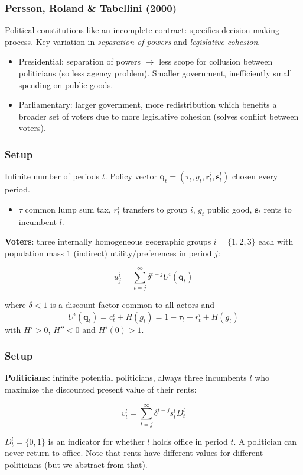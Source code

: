 \documentclass[11pt,aspectratio=169]{beamer}
\begin{document}
\begin{frame}\frametitle{Persson, Roland \& Tabellini (2000)}

Political constitutions like an incomplete contract: specifies decision-making process. Key variation in \textit{separation of powers} and \textit{legislative cohesion}.

\begin{itemize}
\item Presidential: separation of powers $\rightarrow$ less scope for collusion between politicians (so less agency problem). Smaller government, inefficiently small spending on public goods.
\item Parliamentary: larger government, more redistribution which benefits a broader set of voters due to more legislative cohesion (solves conflict between voters).
\end{itemize}

\end{frame}


\begin{frame}
\frametitle{Setup}

\noindent Infinite number of periods $t$.  Policy vector $\textbf{q}_t = (\tau_t, g_t, \textbf{r}_t^i, \textbf{s}_t^l)$ chosen every period.
\begin{itemize}
\item $\tau$ common lump sum tax, $r^i_t$ transfers to group $i$, $g_t$ public good, $\textbf{s}_t$ rents to incumbent $l$.
\end{itemize}

\noindent \textbf{Voters}: three internally homogeneous geographic groups $i=\{1,2,3\}$ each with population mass 1 (indirect) utility/preferences in period $j$: 

$$u_j^i=\sum_{t=j}^{\infty} \delta^{t-j}U^i(\textbf{q}_t)$$ 

where $\delta <1$ is a discount factor common to all actors  and $$U^i(\textbf{q}_t) = c^i_t + H(g_t) = 1-\tau_t + r_t^i + H(g_t)$$ with $H'>0$, $H''<0$ and $H'(0)>1$.
\end{frame}

\begin{frame}
\frametitle{Setup}

\noindent \textbf{Politicians}: infinite potential politicians, always three incumbents $l$ who maximize the discounted present value of their rents: 

$$v_t^l = \sum_{t=j}^{\infty} \delta^{t-j} s_t^l D^l_t$$

$D^l_t = \{0,1\}$ is an indicator for whether $l$ holds office in period $t$. A politician can never return to office. Note that rents have different values for different politicians (but we abstract from that). 





\end{frame}
\end{document}
